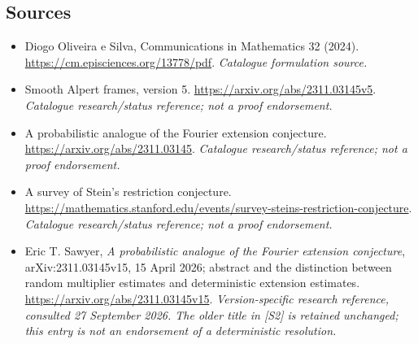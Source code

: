 \documentclass[11pt,a4paper]{article}
\numberwithin{equation}{section}
\begin{document}
\subsection{Sources}
\begin{itemize}\raggedright
\item[\textnormal{[S1]}]\hypertarget{source:46:1}{} Diogo Oliveira e Silva, Communications in Mathematics 32 (2024).
\url{https://cm.episciences.org/13778/pdf}.
{\small\textit{Catalogue formulation source.}}
\item[\textnormal{[S2]}]\hypertarget{source:46:2}{} Smooth Alpert frames, version 5.
\url{https://arxiv.org/abs/2311.03145v5}.
{\small\textit{Catalogue research/status reference; not a proof endorsement.}}
\item[\textnormal{[S3]}]\hypertarget{source:46:3}{} A probabilistic analogue of the Fourier extension conjecture.
\url{https://arxiv.org/abs/2311.03145}.
{\small\textit{Catalogue research/status reference; not a proof endorsement.}}
\item[\textnormal{[S4]}]\hypertarget{source:46:4}{} A survey of Stein's restriction conjecture.
\url{https://mathematics.stanford.edu/events/survey-steins-restriction-conjecture}.
{\small\textit{Catalogue research/status reference; not a proof endorsement.}}
\item[\textnormal{[E1]}]\hypertarget{extra:46:1}{} Eric T. Sawyer,
\emph{A probabilistic analogue of the Fourier extension conjecture},
arXiv:2311.03145v15, 15 April 2026; abstract and the distinction between
random multiplier estimates and deterministic extension estimates.
\url{https://arxiv.org/abs/2311.03145v15}.
{\small\textit{Version-specific research reference, consulted 27 September
2026. The older title in [S2] is retained unchanged; this entry is not an
endorsement of a deterministic resolution.}}
\end{itemize}
\end{document}
